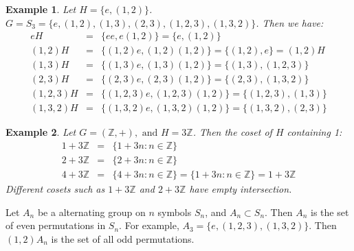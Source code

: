 \documentclass{article}
\theoremstyle{MyNonumberplain}
\theoremstyle{break}
\newcommand{\infixand}{\text{ and }}
\theoremstyle{break}
\newtheorem{example}{Example}[section]
\theoremstyle{break}
\theoremstyle{definition}
\theoremstyle{break}
\begin{document}
\begin{expbox}
    \begin{example}
        Let $H = \{ e, (1, 2) \}$. $G = S_3 =\{e, (1, 2), (1, 3), (2, 3), (1, 2, 3), (1, 3, 2)\}$. Then we have:
        \begin{eqnarray*}
            e H      & = & \{ e e, e (1, 2) \} =\{e, (1, 2)\}\\
            (1, 2) H & = & \{(1, 2) e, (1, 2) (1, 2)\}=\{(1, 2), e\}= (1, 2) H\\
            (1, 3) H & = & \{(1, 3) e, (1, 3) (1, 2)\}= \{ (1, 3), (1, 2, 3) \}\\
            (2, 3) H & = & \{(2, 3) e, (2, 3) (1, 2)\}=\{(2, 3), (1, 3, 2)\}\\
            (1, 2, 3) H & = & \{(1, 2, 3) e, (1, 2, 3) (1, 2)\}=\{(1, 2, 3), (1, 3)\}\\
            (1, 3, 2) H & = & \{(1, 3, 2) e, (1, 3, 2) (1, 2)\}=\{(1, 3, 2), (2, 3)\}
          \end{eqnarray*}
    \end{example}
\end{expbox}

\begin{expbox}
    \begin{example}
        Let $G = (\mathbb{Z}, +), \infixand H = 3\mathbb{Z}$. Then the coset of $H$
        containing 1:
        \begin{eqnarray*}
          1 + 3\mathbb{Z} & = & \{ 1 + 3 n : n \in \mathbb{Z} \}\\
          2 + 3\mathbb{Z} & = & \{ 2 + 3 n : n \in \mathbb{Z} \}\\
          4 + 3\mathbb{Z} & = & \{ 4 + 3 n : n \in \mathbb{Z} \} = \{ 1 + 3 n : n
          \in \mathbb{Z} \} = 1 + 3\mathbb{Z}
        \end{eqnarray*}
        Different cosets such as $1 + 3  \mathbb{Z}$ and $2 + 3\mathbb{Z}$ have empty
        intersection. 
      \end{example}
\end{expbox}

\begin{expbox}
    \begin{example*}
        Let $A_n$ be a alternating group on $n$ symbols $S_n$, and $A_n \subset
        S_n$. Then $A_n$ is the set of even permutations in $S_n$. For example, $A_3
        = \{ e, (1, 2, 3), (1, 3, 2) \}$. Then $(1, 2) A_n$ is the set of all odd permutations. 
      \end{example*}
\end{expbox}
\end{document}
